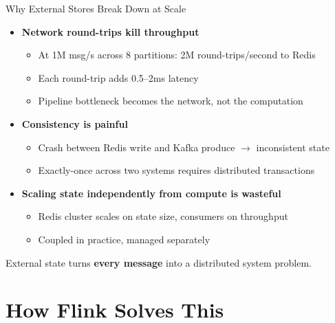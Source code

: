 \documentclass[aspectratio=169]{beamer}
\begin{document}
\begin{frame}{Why External Stores Break Down at Scale}
    \begin{itemize}
        \item \textbf{Network round-trips kill throughput}
        \begin{itemize}
            \item At 1M msg/s across 8 partitions: 2M round-trips/second to Redis
            \item Each round-trip adds 0.5--2ms latency
            \item Pipeline bottleneck becomes the network, not the computation
        \end{itemize}

        \vspace{0.2cm}
        \item \textbf{Consistency is painful}
        \begin{itemize}
            \item Crash between Redis write and Kafka produce $\rightarrow$ inconsistent state
            \item Exactly-once across two systems requires distributed transactions
        \end{itemize}

        \vspace{0.2cm}
        \item \textbf{Scaling state independently from compute is wasteful}
        \begin{itemize}
            \item Redis cluster scales on state size, consumers on throughput
            \item Coupled in practice, managed separately
        \end{itemize}
    \end{itemize}

    \vspace{0.2cm}
    \colorbox{utu_pink!20}{\parbox{0.9\textwidth}{
        \centering
        External state turns \textbf{every message} into a distributed system problem.
    }}
\end{frame}

\section{How Flink Solves This}
\end{document}
